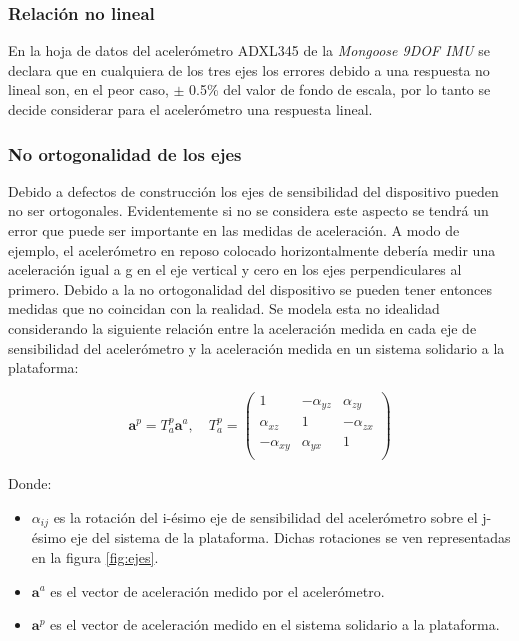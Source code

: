 \documentclass[spanish,12pt,a4paper,titlepage]{report}
\begin{document}
\subsubsection*{Relación no lineal}
En la hoja de datos del acelerómetro ADXL345 de la \emph{Mongoose 9DOF IMU} se declara que en cualquiera de los tres ejes los errores debido a una respuesta no lineal son, en el peor caso, $\pm$ 0.5\% del valor de fondo de escala, por lo tanto se decide considerar para el acelerómetro una respuesta lineal.

\subsubsection*{No ortogonalidad de los ejes}
Debido a defectos de construcción los ejes de sensibilidad del dispositivo pueden no ser ortogonales. Evidentemente si no se considera este aspecto se tendrá un error que puede ser importante en las medidas de aceleración. A modo de ejemplo, el acelerómetro en reposo colocado horizontalmente debería medir una aceleración igual a g en el eje vertical y cero en los ejes perpendiculares al primero. Debido a la no ortogonalidad del dispositivo se pueden tener entonces medidas que no coincidan con la realidad. Se modela esta no idealidad considerando la siguiente relación entre la aceleración medida en cada eje de sensibilidad del acelerómetro y la aceleración medida en un sistema solidario a la plataforma:

$$\mathbf{a}^p=T^p_a \mathbf{a}^a, \quad  T^p_a=\left( \begin{matrix}
1 &-\alpha_{yz} &\alpha_{zy}\\
\alpha_{xz} &1& -\alpha_{zx} \\
-\alpha_{xy} &\alpha_{yx} &1\\
\end{matrix} 
\right)$$

Donde:
\begin{itemize}
\item $\alpha_{ij}$ es la rotación del  i-ésimo eje de sensibilidad del acelerómetro sobre el j-ésimo eje del sistema de la plataforma. Dichas rotaciones se ven representadas en la figura \ref{fig:ejes}.
\item $\mathbf{a}^a$ es el vector de aceleración medido por el acelerómetro.
\item $\mathbf{a}^p$ es el vector de aceleración medido en el sistema solidario a la plataforma.
\end{itemize}
\end{document}
